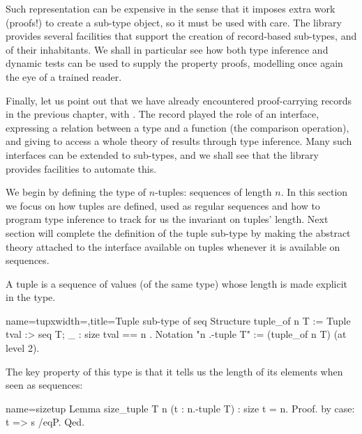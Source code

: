 Such representation can be expensive in the sense that it imposes
extra work (proofs!) to create a sub-type object, so it must be used
with care.  The \mcbMC{} library provides several facilities that
support the creation of record-based sub-types, and of their
inhabitants.  We shall in particular see how both type inference and
dynamic tests can be used to supply the property proofs, modelling
once again the eye of a trained reader.

Finally, let us point out that we have already encountered proof-carrying
records in the previous chapter, with .
The  record played the role of an interface,
expressing a relation between a type and a function (the comparison operation),
and giving to access a whole theory of results through type inference.
Many such interfaces can be extended to sub-types, and we shall see that
the \mcbMC{} library provides facilities to automate this.

\mcbLEARN{}
\mcbNOTES{}

We begin by defining the type of $n$-tuples: sequences of length $n$.
In this section we focus on how tuples are defined, used as regular
sequences and how to program type inference to track for us the
invariant on tuples' length.  Next section will complete the
definition of the tuple sub-type by making the abstract theory
attached to the  interface available on tuples whenever it is
available on sequences.

A tuple is a sequence of values (of the same type) whose length is
made explicit in the type.

\begin{coq}{name=tupx}{width=\textwidth,title=Tuple sub-type of seq}
Structure tuple_of n T :=  Tuple { tval :> seq T; _ : size tval == n }.
Notation "n .-tuple T" := (tuple_of n T) (at level 2).
\end{coq}


The key property of this type is that it tells us the length of its
elements when seen as sequences:

\begin{coq}{name=sizetup}{}
Lemma size_tuple T n (t : n.-tuple T) : size t = n.
Proof. by case: t => s /eqP. Qed.
\end{coq}

